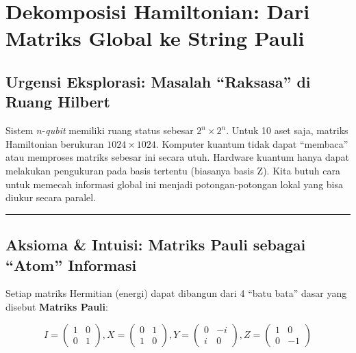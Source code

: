 \section{Dekomposisi Hamiltonian: Dari Matriks Global ke String Pauli}\label{appendix-e}

\hypertarget{urgensi-eksplorasi-masalah-raksasa-di-ruang-hilbert}{%
\subsection{Urgensi Eksplorasi: Masalah ``Raksasa'' di Ruang Hilbert}\label{urgensi-eksplorasi-masalah-raksasa-di-ruang-hilbert}}

Sistem \(n\)-\emph{qubit} memiliki ruang status sebesar \(2^n \times 2^n\). Untuk 10 aset saja, matriks Hamiltonian berukuran \(1024 \times 1024\). Komputer kuantum tidak dapat ``membaca'' atau memproses matriks sebesar ini secara utuh. Hardware kuantum hanya dapat melakukan pengukuran pada basis tertentu (biasanya basis Z). Kita butuh cara untuk memecah informasi global ini menjadi potongan-potongan lokal yang bisa diukur secara paralel.

\begin{center}\rule{0.5\linewidth}{0.5pt}\end{center}

\hypertarget{aksioma-intuisi-matriks-pauli-sebagai-atom-informasi}{%
\subsection{Aksioma \& Intuisi: Matriks Pauli sebagai ``Atom'' Informasi}\label{aksioma-intuisi-matriks-pauli-sebagai-atom-informasi}}

Setiap matriks Hermitian (energi) dapat dibangun dari 4 ``batu bata'' dasar yang disebut \textbf{Matriks Pauli}:

\[ I = \begin{pmatrix} 1 & 0 \\ 0 & 1 \end{pmatrix}, X = \begin{pmatrix} 0 & 1 \\ 1 & 0 \end{pmatrix}, Y = \begin{pmatrix} 0 & -i \\ i & 0 \end{pmatrix}, Z = \begin{pmatrix} 1 & 0 \\ 0 & -1 \end{pmatrix} \]

